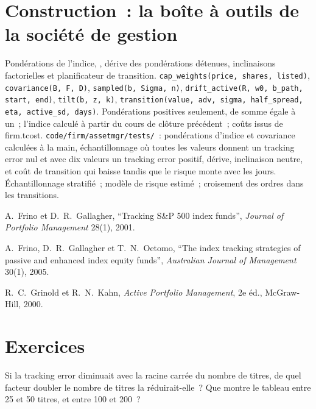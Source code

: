 \section{Construction~: la boîte à outils de la société de gestion}\label{bld:s1:the-asset-managers-strategies:assetmgr}

\begin{build}
 Pondérations de l'indice, , dérive des pondérations détenues, inclinaisons factorielles et planificateur de transition.
 \texttt{cap\_weights(price, shares, listed)}, \texttt{covariance(B, F, D)}, \texttt{sampled(b, Sigma, n)},
\texttt{drift\_active(R, w0, b\_path, start, end)}, \texttt{tilt(b, z, k)}, \texttt{transition(value, adv, sigma, half\_spread, eta, active\_sd, days)}.
 Pondérations positives seulement, de somme égale à un~; l'indice calculé à partir du cours de clôture précédent~; coûts issus de firm.tcost.
 \texttt{code/firm/assetmgr/tests/}~: pondérations d'indice et covariance calculées à la main, échantillonnage où toutes les valeurs donnent un tracking error nul et
avec dix valeurs un tracking error positif, dérive, inclinaison neutre, et coût de transition qui baisse tandis que le risque monte avec les jours.
 Échantillonnage stratifié~; modèle de risque estimé~; croisement des ordres dans les transitions.
\end{build}

\begin{omsources}
\item A.~Frino et D.~R.~Gallagher, ``Tracking S\&P 500 index funds'', \emph{Journal of Portfolio Management} 28(1), 2001.
\item A.~Frino, D.~R.~Gallagher et T.~N.~Oetomo, ``The index tracking strategies of passive and enhanced index equity funds'', \emph{Australian Journal
of Management} 30(1), 2005.
\item R.~C.~Grinold et R.~N.~Kahn, \emph{Active Portfolio Management}, 2e éd., McGraw-Hill, 2000.
\end{omsources}

\section{Exercices}

\begin{exercise}[$\star$]\label{exo:s1:the-asset-managers-strategies:1}
Si la tracking error diminuait avec la racine carrée du nombre de titres, de quel facteur doubler le nombre de titres la réduirait-elle~? Que montre le tableau entre 25 et 50
titres, et entre 100 et 200~?
\end{exercise}

